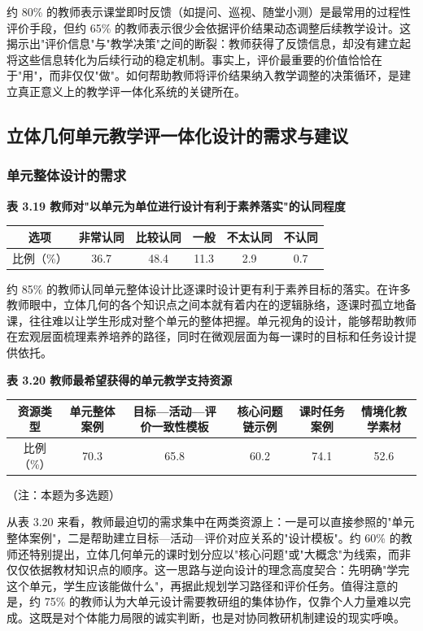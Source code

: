 \documentclass[UTF8,a4paper,12pt,twoside]{ctexart}
\begin{document}
约 80\% 的教师表示课堂即时反馈（如提问、巡视、随堂小测）是最常用的过程性评价手段，但约 65\% 的教师表示很少会依据评价结果动态调整后续教学设计。这揭示出"评价信息"与"教学决策"之间的断裂：教师获得了反馈信息，却没有建立起将这些信息转化为后续行动的稳定机制。事实上，评价最重要的价值恰恰在于"用"，而非仅仅"做"。如何帮助教师将评价结果纳入教学调整的决策循环，是建立真正意义上的教学评一体化系统的关键所在。

\subsection{立体几何单元教学评一体化设计的需求与建议}

\subsubsection{单元整体设计的需求}

\textbf{表 3.19 教师对"以单元为单位进行设计有利于素养落实"的认同程度}

\begin{center}
\begin{tabular}{|c|c|c|c|c|c|}
\hline
选项 & 非常认同 & 比较认同 & 一般 & 不太认同 & 不认同 \\
\hline
比例（\%） & 36.7 & 48.4 & 11.3 & 2.9 & 0.7 \\
\hline
\end{tabular}
\end{center}

约 85\% 的教师认同单元整体设计比逐课时设计更有利于素养目标的落实。在许多教师眼中，立体几何的各个知识点之间本就有着内在的逻辑脉络，逐课时孤立地备课，往往难以让学生形成对整个单元的整体把握。单元视角的设计，能够帮助教师在宏观层面梳理素养培养的路径，同时在微观层面为每一课时的目标和任务设计提供依托。

\textbf{表 3.20 教师最希望获得的单元教学支持资源}

\begin{center}
\begin{tabular}{|c|c|c|c|c|c|}
\hline
资源类型 & 单元整体案例 & 目标—活动—评价一致性模板 & 核心问题链示例 & 课时任务案例 & 情境化教学素材 \\
\hline
比例（\%） & 70.3 & 65.8 & 60.2 & 74.1 & 52.6 \\
\hline
\end{tabular}
\end{center}

（注：本题为多选题）

从表 3.20 来看，教师最迫切的需求集中在两类资源上：一是可以直接参照的"单元整体案例"，二是帮助建立目标—活动—评价对应关系的"设计模板"。约 60\% 的教师还特别提出，立体几何单元的课时划分应以"核心问题"或"大概念"为线索，而非仅仅依据教材知识点的顺序。这一思路与逆向设计的理念高度契合：先明确"学完这个单元，学生应该能做什么"，再据此规划学习路径和评价任务。值得注意的是，约 75\% 的教师认为大单元设计需要教研组的集体协作，仅靠个人力量难以完成。这既是对个体能力局限的诚实判断，也是对协同教研机制建设的现实呼唤。
\end{document}
